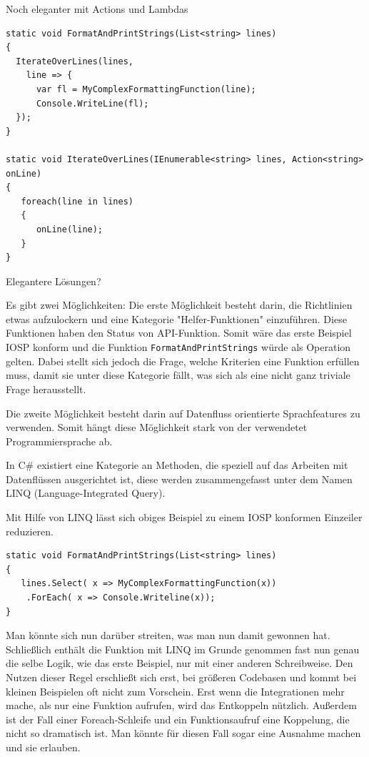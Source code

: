 \documentclass[a4paper,12pt,oneside]{book}
\begin{document}
Noch eleganter mit Actions und Lambdas

\begin{verbatim}
static void FormatAndPrintStrings(List<string> lines)
{
  IterateOverLines(lines,
    line => {
      var fl = MyComplexFormattingFunction(line);
      Console.WriteLine(fl);
  });
}

static void IterateOverLines(IEnumerable<string> lines, Action<string> onLine)
{
   foreach(line in lines)
   {
      onLine(line);
   }
}
\end{verbatim}


Elegantere Lösungen?

Es gibt zwei Möglichkeiten: Die erste Möglichkeit besteht darin, die Richtlinien etwas aufzulockern und eine Kategorie "Helfer-Funktionen" einzuführen.
Diese Funktionen haben den Status von API-Funktion. Somit wäre das erste Beispiel IOSP konform und die Funktion \texttt{FormatAndPrintStrings}
würde als Operation gelten.
Dabei stellt sich jedoch die Frage, welche Kriterien eine Funktion erfüllen muss, damit sie unter diese Kategorie
fällt, was sich als eine nicht ganz triviale Frage herausstellt.

Die zweite Möglichkeit besteht darin auf Datenfluss orientierte Sprachfeatures zu verwenden.
Somit hängt diese Möglichkeit stark von der verwendetet Programmiersprache ab.

In C\# existiert eine Kategorie an Methoden, die speziell auf das Arbeiten mit Datenflüssen ausgerichtet ist, diese werden
zusammengefasst unter dem Namen LINQ (Language-Integrated Query).

Mit Hilfe von LINQ lässt sich obiges Beispiel zu einem IOSP konformen Einzeiler reduzieren.

\begin{verbatim}
static void FormatAndPrintStrings(List<string> lines)
{
   lines.Select( x => MyComplexFormattingFunction(x))
	.ForEach( x => Console.Writeline(x));
}
\end{verbatim}
Man könnte sich nun darüber streiten, was man nun damit gewonnen hat. Schließlich enthält die Funktion mit LINQ im Grunde
genommen fast nun genau die selbe Logik, wie das erste Beispiel, nur mit einer anderen Schreibweise.
Den Nutzen dieser Regel erschließt sich erst, bei größeren Codebasen und kommt bei kleinen Beispielen oft nicht zum Vorschein.
Erst wenn die Integrationen mehr mache, als nur eine Funktion aufrufen, wird das Entkoppeln nützlich.
Außerdem ist der Fall einer Foreach-Schleife und ein Funktionsaufruf eine Koppelung, die nicht so dramatisch ist. Man
könnte für diesen Fall sogar eine Ausnahme machen und sie erlauben.
\end{document}
